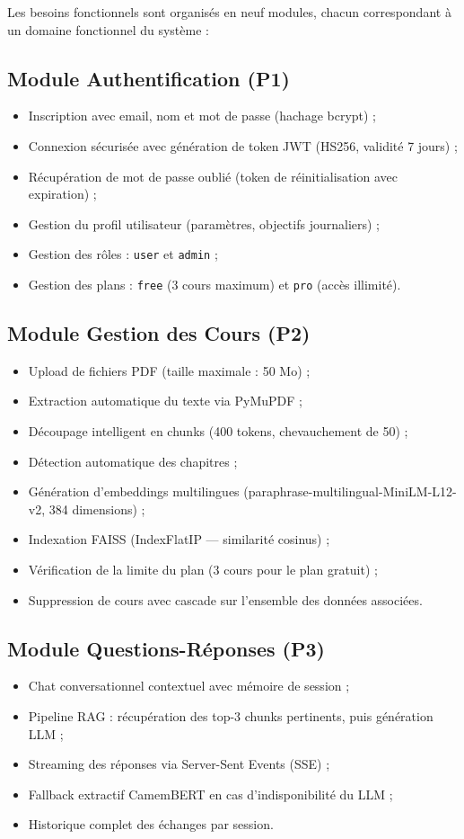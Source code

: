 Les besoins fonctionnels sont organisés en neuf modules, chacun correspondant à un domaine fonctionnel du système :

\subsection{Module Authentification (P1)}
\begin{itemize}
  \item Inscription avec email, nom et mot de passe (hachage bcrypt) ;
  \item Connexion sécurisée avec génération de token JWT (HS256, validité 7 jours) ;
  \item Récupération de mot de passe oublié (token de réinitialisation avec expiration) ;
  \item Gestion du profil utilisateur (paramètres, objectifs journaliers) ;
  \item Gestion des rôles : \texttt{user} et \texttt{admin} ;
  \item Gestion des plans : \texttt{free} (3 cours maximum) et \texttt{pro} (accès illimité).
\end{itemize}

\subsection{Module Gestion des Cours (P2)}
\begin{itemize}
  \item Upload de fichiers PDF (taille maximale : 50 Mo) ;
  \item Extraction automatique du texte via PyMuPDF ;
  \item Découpage intelligent en chunks (400 tokens, chevauchement de 50) ;
  \item Détection automatique des chapitres ;
  \item Génération d'embeddings multilingues (paraphrase-multilingual-MiniLM-L12-v2, 384 dimensions) ;
  \item Indexation FAISS (IndexFlatIP — similarité cosinus) ;
  \item Vérification de la limite du plan (3 cours pour le plan gratuit) ;
  \item Suppression de cours avec cascade sur l'ensemble des données associées.
\end{itemize}

\subsection{Module Questions-Réponses (P3)}
\begin{itemize}
  \item Chat conversationnel contextuel avec mémoire de session ;
  \item Pipeline RAG : récupération des top-3 chunks pertinents, puis génération LLM ;
  \item Streaming des réponses via Server-Sent Events (SSE) ;
  \item Fallback extractif CamemBERT en cas d'indisponibilité du LLM ;
  \item Historique complet des échanges par session.
\end{itemize}

